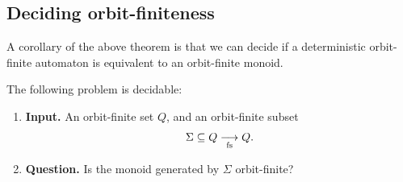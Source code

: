 \subsection{Deciding orbit-finiteness}
\label{sec:deciding-monoids}
A corollary of the above theorem is that we can decide if a deterministic orbit-finite automaton is equivalent to an orbit-finite monoid. 
\begin{corollary}
    \label{cor:decide-orbit-finite-submonoids}
    The following problem is decidable: 
    \begin{enumerate}
        \item \textbf{Input.} An orbit-finite set $Q$, and an orbit-finite subset 
        \begin{align*}
        \Sigma \subseteq Q \underset {\text{fs}} \longrightarrow Q.
        \end{align*}
        \item \textbf{Question.} Is the monoid generated by $\Sigma$ orbit-finite?
    \end{enumerate}
\end{corollary}
